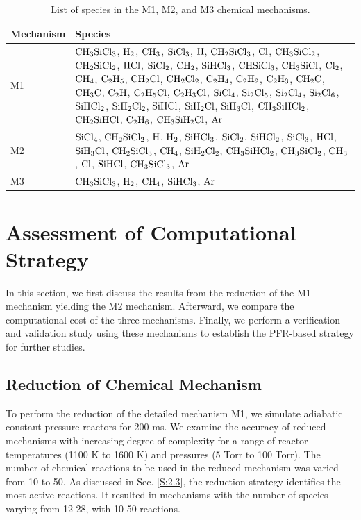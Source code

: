 \documentclass[final, letterpaper, square, comma, numbers, sort&compress]{elsarticle}
\begin{document}
\begin{table}[t] %
    \centering
    \caption{List of species in the M1, M2, and M3 chemical mechanisms.}
    \label{table:1}
    \begin{tabular}{ | p{}<{\centering} | p{}<{\centering}|}
        \hline
        Mechanism & Species \\
        \hline
        M1 & $\rm CH_3SiCl_3$, $\rm H_2$, $\rm CH_3$, $\rm SiCl_3$, $\rm H$, $\rm CH_2SiCl_3$, $\rm Cl$, $\rm CH_3SiCl_2$, $\rm CH_2SiCl_2$, $\rm HCl$, $\rm SiCl_2$, $\rm CH_2$, $\rm SiHCl_3$, $\rm CHSiCl_3$, $\rm CH_3SiCl$, $\rm Cl_2$, $\rm CH_4$, $\rm C_2H_5$, $\rm CH_2Cl$, $\rm CH_2Cl_2$, $\rm C_2H_4$, $\rm C_2H_2$, $\rm C_2H_3$, $\rm CH_2C$, $\rm CH_3C$, $\rm C_2H$, $\rm C_2H_5Cl$, $\rm C_2H_3Cl$, $\rm SiCl_4$, $\rm Si_2Cl_5$, $\rm Si_2Cl_4$, $\rm Si_2Cl_6$, $\rm SiHCl_2$, $\rm SiH_2Cl_2$, $\rm SiHCl$, $\rm SiH_2Cl$, $\rm SiH_3Cl$, $\rm CH_3SiHCl_2$, $\rm CH_2SiHCl$, $\rm C_2H_6$, $\rm CH_3SiH_2Cl$, $\rm Ar$ \\
        \hline
        M2 & $\rm SiCl_4$, $\rm CH_2SiCl_2$, $\rm H$, $\rm H_2$, $\rm SiHCl_3$, $\rm SiCl_2$, $\rm SiHCl_2$, $\rm SiCl_3$, $\rm HCl$, $\rm SiH_3Cl$, $\rm CH_2SiCl_3$, $\rm CH_4$, $\rm SiH_2Cl_2$, $\rm CH_3SiHCl_2$, $\rm CH_3SiCl_2$, $\rm CH_3$, $\rm Cl $, $\rm SiHCl$, $\rm CH_3SiCl_3$, $\rm Ar$ \\
        \hline
        M3 & $\rm CH_3SiCl_3$, $\rm H_2$, $\rm CH_4$, $\rm SiHCl_3$, $\rm Ar$ \\
        \hline
    \end{tabular}
\end{table}

\section{Assessment of Computational Strategy}
\label{S:3}
In this section, we first discuss the results from the reduction of the M1 mechanism yielding the M2 mechanism. Afterward, we compare the computational cost of the three mechanisms. Finally, we perform a verification and validation study using these mechanisms to establish the PFR-based strategy for further studies.

\subsection{Reduction of Chemical Mechanism}
\label{S:3.1}
To perform the reduction of the detailed mechanism M1, we simulate adiabatic constant-pressure reactors for 200 ms. We examine the accuracy of reduced mechanisms with increasing degree of complexity for a range of reactor temperatures (1100 K to 1600 K) and pressures (5 Torr to 100 Torr). The number of chemical reactions to be used in the reduced mechanism was varied from 10 to 50. As discussed in Sec. \ref{S:2.3}, the reduction strategy identifies the most active reactions. It resulted in mechanisms with the number of species varying from 12-28, with 10-50 reactions.
\end{document}
